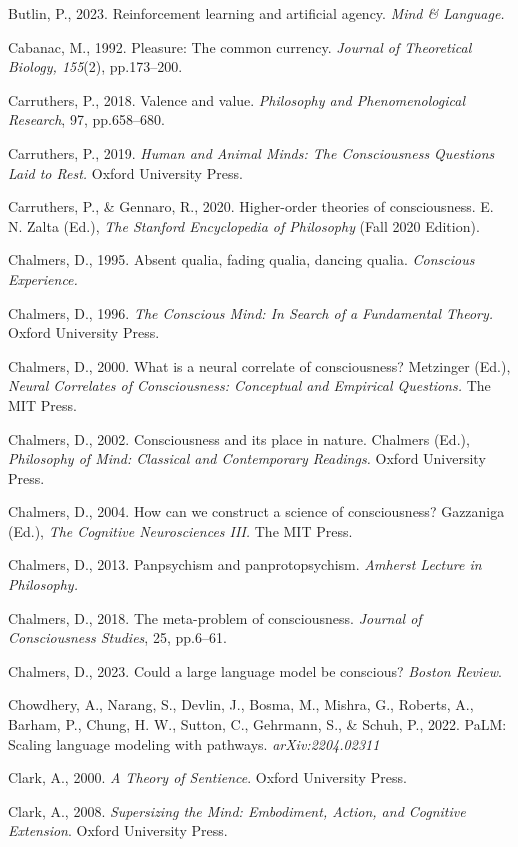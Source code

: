 \documentclass[12pt]{article}
\begin{document}
Butlin, P., 2023. Reinforcement learning and artificial agency.
\emph{Mind \& Language.}

Cabanac, M., 1992. Pleasure: The common currency. \emph{Journal of
Theoretical Biology, 155}(2), pp.173--200.

Carruthers, P., 2018. Valence and value. \emph{Philosophy and
Phenomenological Research}, 97, pp.658--680.

Carruthers, P., 2019. \emph{Human and Animal Minds: The Consciousness
Questions Laid to Rest.} Oxford University Press.

Carruthers, P., \& Gennaro, R., 2020. Higher-order theories of
consciousness. E. N. Zalta (Ed.), \emph{The Stanford Encyclopedia of
Philosophy} (Fall 2020 Edition).

Chalmers, D., 1995. Absent qualia, fading qualia, dancing qualia.
\emph{Conscious Experience.}

Chalmers, D., 1996. \emph{The Conscious Mind: In Search of a Fundamental
Theory.} Oxford University Press.

Chalmers, D., 2000. What is a neural correlate of consciousness?
Metzinger (Ed.), \emph{Neural Correlates of Consciousness: Conceptual
and Empirical Questions.} The MIT Press.

Chalmers, D., 2002. Consciousness and its place in nature. Chalmers
(Ed.), \emph{Philosophy of Mind: Classical and Contemporary Readings.}
Oxford University Press.

Chalmers, D., 2004. How can we construct a science of consciousness?
Gazzaniga (Ed.), \emph{The Cognitive Neurosciences III.} The MIT Press.

Chalmers, D., 2013. Panpsychism and panprotopsychism. \emph{Amherst
Lecture in Philosophy.}

Chalmers, D., 2018. The meta-problem of consciousness. \emph{Journal of
Consciousness Studies}, 25, pp.6--61.

Chalmers, D., 2023. Could a large language model be conscious?
\emph{Boston Review}.

Chowdhery, A., Narang, S., Devlin, J., Bosma, M., Mishra, G., Roberts,
A., Barham, P., Chung, H. W., Sutton, C., Gehrmann, S., \& Schuh, P.,
2022. PaLM: Scaling language modeling with pathways.
\emph{arXiv:2204.02311}

Clark, A., 2000. \emph{A Theory of Sentience}. Oxford University Press.

Clark, A., 2008. \emph{Supersizing the Mind: Embodiment, Action, and
Cognitive Extension}. Oxford University Press.
\end{document}

